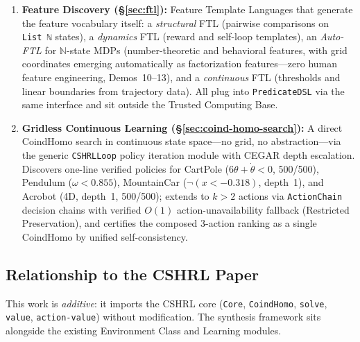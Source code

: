 \documentclass[9pt,a4paper]{article}
\theoremstyle{plain}
\theoremstyle{definition}
\theoremstyle{remark}
\begin{document}
\begin{enumerate}
\item \textbf{Feature Discovery (\S\ref{sec:ftl}):} Feature Template Languages that generate the feature vocabulary itself: a \emph{structural} FTL (pairwise comparisons on \texttt{List~ℕ} states), a \emph{dynamics} FTL (reward and self-loop templates), an \emph{Auto-FTL} for $\mathbb{N}$-state MDPs (number-theoretic and behavioral features, with grid coordinates emerging automatically as factorization features---zero human feature engineering, Demos~10--13), and a \emph{continuous} FTL (thresholds and linear boundaries from trajectory data).  All plug into \texttt{PredicateDSL} via the same interface and sit outside the Trusted Computing Base.

\item \textbf{Gridless Continuous Learning (\S\ref{sec:coind-homo-search}):} A direct CoindHomo search in continuous state space---no grid, no abstraction---via the generic \texttt{CSHRLLoop} policy iteration module with CEGAR depth escalation.  Discovers one-line verified policies for CartPole ($6\theta + \dot\theta < 0$, 500/500), Pendulum ($\omega < 0.855$), MountainCar ($\lnot(x < -0.318)$, depth~1), and Acrobot (4D, depth~1, 500/500); extends to $k > 2$ actions via \texttt{ActionChain} decision chains with verified $O(1)$ action-unavailability fallback (Restricted Preservation), and certifies the composed 3-action ranking as a single CoindHomo by unified self-consistency.

\end{enumerate}

\subsection{Relationship to the CSHRL Paper}

This work is \emph{additive}: it imports the CSHRL core (\texttt{Core}, \texttt{CoindHomo}, \texttt{solve}, \texttt{value}, \texttt{action-value}) without modification.  The synthesis framework sits alongside the existing Environment Class and Learning modules.
\end{document}

